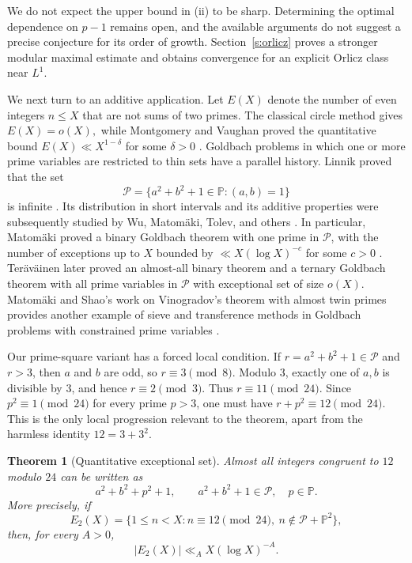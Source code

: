 \documentclass[12pt,reqno]{amsart}
\numberwithin{equation}{section}
\newtheorem{theorem}[equation]{Theorem}
\theoremstyle{definition}
\theoremstyle{remark}
\begin{document}
We do not expect the upper bound in \textup{(ii)} to be sharp.
Determining the optimal dependence on \(p-1\) remains open,
and the available arguments do not suggest a precise conjecture
for its order of growth.
Section~\ref{s:orlicz} proves a stronger modular maximal estimate
and obtains convergence for an explicit Orlicz class near \(L^1\).




\medskip

We next turn to an additive application.  Let \(E(X)\) denote the
number of even integers \(n\leq X\) that are not sums of two primes.
The classical circle method gives $ E(X)=o(X),$
while Montgomery and Vaughan proved the quantitative bound $E(X)\ll X^{1-\delta}$
for some \(\delta>0\) \cite{MontgomeryVaughan}.
Goldbach problems in which one or more prime variables are restricted
to thin sets have a parallel history.  Linnik proved that the set
\[
 \mathcal P=
 \{a^2+b^2+1\in\mathbb P:(a,b)=1\}
\]
is infinite \cite{L60}.  Its distribution in short intervals and its
additive properties were subsequently studied by Wu, Matom\"aki, Tolev,
and others \cite{W98,Mat07,T99,T09,T09b,motamake}.  In particular,
Matom\"aki proved a binary Goldbach theorem with one prime in
\(\mathcal P\), with the number of exceptions up to \(X\) bounded by $ \ll X(\log X)^{-c}$
for some \(c>0\) \cite{motamake}.
Ter\"av\"ainen later proved an almost-all binary theorem and a ternary
Goldbach theorem with all prime variables in \(\mathcal P\)
\cite{Te16} with exceptional set of size $o(X)$.  Matom\"aki and Shao's work on Vinogradov's theorem with
almost twin primes provides another example of sieve and transference
methods in Goldbach problems with constrained prime variables
\cite{MatomakiShao}.

Our prime-square variant has a forced local condition.  If
$r=a^2+b^2+1\in\mathcal P$ and $r>3$, then $a$ and $b$ are odd, so
$r\equiv3\pmod8$.  Modulo $3$, exactly one of $a,b$ is divisible by
$3$, and hence $r\equiv2\pmod3$.  Thus $r\equiv11\pmod{24}$.  Since
$p^2\equiv1\pmod{24}$ for every prime $p>3$, one must have
$r+p^2\equiv12\pmod{24}$.  This is the only local progression relevant
to the theorem, apart from the harmless identity $12=3+3^2$.

\begin{theorem}[Quantitative exceptional set]\label{t:repmotthm}
Almost all integers congruent to $12$ modulo $24$ can be written as
\[
 a^2+b^2+p^2+1,
 \qquad a^2+b^2+1\in\mathcal P,\quad p\in\mathbb P.
\]
More precisely, if
\[
 E_2(X)=\{1\leq n<X:n\equiv12\pmod{24},\
 n\notin\mathcal P+\mathbb P^2\},
\]
then, for every $A>0$,
\[
 |E_2(X)|\ll_A X(\log X)^{-A}.
\]
\end{theorem}
\end{document}
